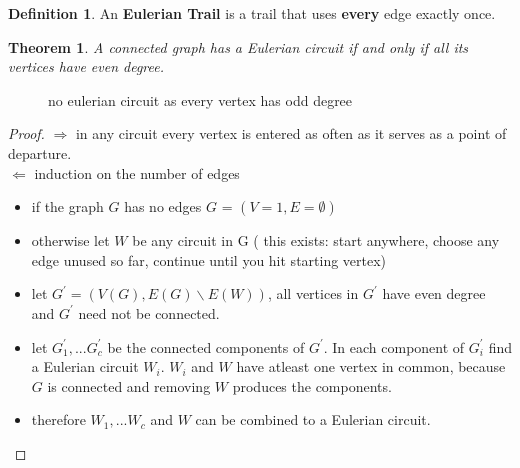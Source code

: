 \documentclass{article}
\newtheorem*{theorem}{Theorem}
\theoremstyle{definition}
\newtheorem*{definition}{Definition}
\theoremstyle{remark}
\begin{document}
\begin{definition}
    An \textbf{Eulerian Trail} is a trail that uses \textbf{every} edge exactly once.
\end{definition}
\begin{theorem}
    A connected graph has a Eulerian circuit if and only if all its vertices have even degree.
\end{theorem}
\begin{figure}[h!]
    \centering
    \caption{no eulerian circuit as every vertex has odd degree}
\end{figure}
\begin{proof}
    $\Rightarrow$ in any circuit every vertex is entered as often as it serves as a point of departure.\\
    $\Leftarrow$ induction on the number of edges
    \begin{itemize}
        \item if the graph $G$ has no edges $G$ = $(V = {1}, E = \emptyset)$
        \item otherwise let $W$ be any circuit in G ( this exists: start anywhere, choose any edge unused so far, continue until you hit starting vertex)
        \item let $G^\prime = (V(G), E(G)\backslash E(W))$, all vertices in $G^\prime$ have even degree and $G^\prime$ need not be connected.
        \item let $G^\prime_1, ... G^\prime_c$ be the connected components of $G^\prime$. In each component of $G^\prime_i$ find a Eulerian circuit $W_i$. $W_i$ and $W$ have atleast one vertex in common, because $G$ is connected and removing $W$ produces the components.
        \item therefore $W_1, ... W_c$ and $W$ can be combined to a Eulerian circuit. 
    \end{itemize}
\end{proof}
\end{document}
